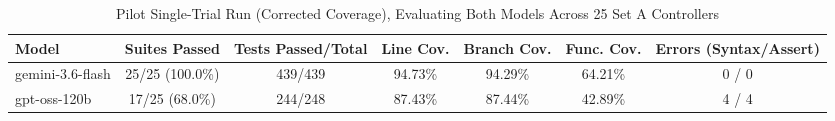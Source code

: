 \begin{table}[t]
\centering
\caption{Pilot Single-Trial Run (Corrected Coverage), Evaluating Both Models Across 25 Set A Controllers}
\label{tab:pilot_run_corrected}
\begin{tabular}{lcccccc}
\toprule
\textbf{Model} & \textbf{Suites Passed} & \textbf{Tests Passed/Total} & \textbf{Line Cov.} & \textbf{Branch Cov.} & \textbf{Func. Cov.} & \textbf{Errors (Syntax/Assert)} \\
\midrule
gemini-3.6-flash & 25/25 (100.0\%) & 439/439 & 94.73\% & 94.29\% & 64.21\% & 0 / 0 \\
gpt-oss-120b & 17/25 (68.0\%) & 244/248 & 87.43\% & 87.44\% & 42.89\% & 4 / 4 \\
\bottomrule
\end{tabular}
\end{table}

